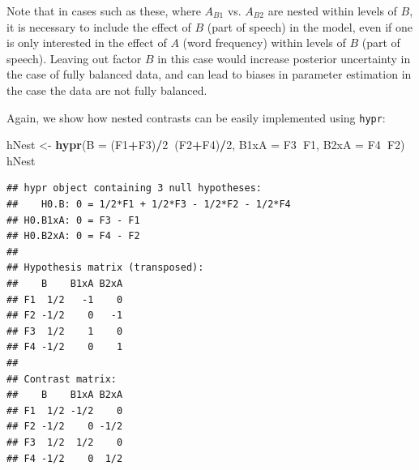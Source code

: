 \documentclass[12pt,]{krantz}
\newenvironment{Shaded}{\begin{snugshade}}{\end{snugshade}}
\newcommand{\KeywordTok}[1]{\textcolor[rgb]{0.13,0.29,0.53}{\textbf{#1}}}
\newcommand{\DataTypeTok}[1]{\textcolor[rgb]{0.13,0.29,0.53}{#1}}
\newcommand{\DecValTok}[1]{\textcolor[rgb]{0.00,0.00,0.81}{#1}}
\newcommand{\StringTok}[1]{\textcolor[rgb]{0.31,0.60,0.02}{#1}}
\newcommand{\OperatorTok}[1]{\textcolor[rgb]{0.81,0.36,0.00}{\textbf{#1}}}
\newcommand{\NormalTok}[1]{#1}
\theoremstyle{definition}
\theoremstyle{definition}
\theoremstyle{definition}
\theoremstyle{remark}
\begin{document}
Note that in cases such as these, where \(A_{B1}\) vs. \(A_{B2}\) are
nested within levels of \(B\), it is necessary to include the effect of
\(B\) (part of speech) in the model, even if one is only interested in
the effect of \(A\) (word frequency) within levels of \(B\) (part of
speech). Leaving out factor \(B\) in this case would increase posterior
uncertainty in the case of fully balanced data, and can lead to biases
in parameter estimation in the case the data are not fully balanced.

Again, we show how nested contrasts can be easily implemented using
\texttt{hypr}:

\begin{Shaded}
\begin{Highlighting}[]
\NormalTok{hNest <-}\StringTok{ }\KeywordTok{hypr}\NormalTok{(}\DataTypeTok{B    =}\NormalTok{ (F1}\OperatorTok{+}\NormalTok{F3)}\OperatorTok{/}\DecValTok{2}\OperatorTok{~}\NormalTok{(F2}\OperatorTok{+}\NormalTok{F4)}\OperatorTok{/}\DecValTok{2}\NormalTok{,}
              \DataTypeTok{B1xA =}\NormalTok{ F3}\OperatorTok{~}\NormalTok{F1,}
              \DataTypeTok{B2xA =}\NormalTok{ F4}\OperatorTok{~}\NormalTok{F2)}
\NormalTok{hNest}
\end{Highlighting}
\end{Shaded}

\begin{verbatim}
## hypr object containing 3 null hypotheses:
##    H0.B: 0 = 1/2*F1 + 1/2*F3 - 1/2*F2 - 1/2*F4
## H0.B1xA: 0 = F3 - F1
## H0.B2xA: 0 = F4 - F2
## 
## Hypothesis matrix (transposed):
##    B    B1xA B2xA
## F1  1/2   -1    0
## F2 -1/2    0   -1
## F3  1/2    1    0
## F4 -1/2    0    1
## 
## Contrast matrix:
##    B    B1xA B2xA
## F1  1/2 -1/2    0
## F2 -1/2    0 -1/2
## F3  1/2  1/2    0
## F4 -1/2    0  1/2
\end{verbatim}

\begin{Shaded}
\end{Shaded}
\end{document}
